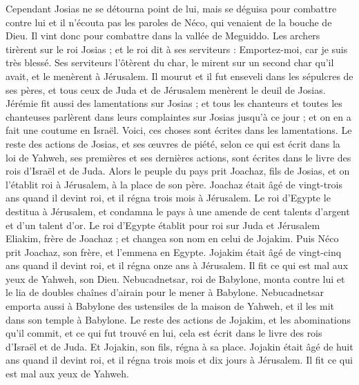 \begin{multicols}{2}
Cependant Josias ne se détourna point de lui, mais se déguisa pour combattre contre lui et il n'écouta pas les paroles de Néco, qui venaient de la bouche de Dieu. Il vint donc pour combattre dans la vallée de Meguiddo.
Les archers tirèrent sur le roi Josias ; et le roi dit à ses serviteurs : Emportez-moi, car je suis très blessé.
Ses serviteurs l'ôtèrent du char, le mirent sur un second char qu'il avait, et le menèrent à Jérusalem. Il mourut et il fut enseveli dans les sépulcres de ses pères, et tous ceux de Juda et de Jérusalem menèrent le deuil de Josias.
Jérémie fit aussi des lamentations sur Josias ; et tous les chanteurs et toutes les chanteuses parlèrent dans leurs complaintes sur Josias jusqu'à ce jour ; et on en a fait une coutume en Israël. Voici, ces choses sont écrites dans les lamentations.
Le reste des actions de Josias, et ses œuvres de piété, selon ce qui est écrit dans la loi de Yahweh,
ses premières et ses dernières actions, sont écrites dans le livre des rois d'Israël et de Juda.
\VerseOne{}Alors le peuple du pays prit Joachaz, fils de Josias, et on l'établit roi à Jérusalem, à la place de son père.
Joachaz était âgé de vingt-trois ans quand il devint roi, et il régna trois mois à Jérusalem.
Le roi d'Egypte le destitua à Jérusalem, et condamna le pays à une amende de cent talents d'argent et d'un talent d'or.
Le roi d'Egypte établit pour roi sur Juda et Jérusalem Eliakim, frère de Joachaz ; et changea son nom en celui de Jojakim. Puis Néco prit Joachaz, son frère, et l'emmena en Egypte.
Jojakim était âgé de vingt-cinq ans quand il devint roi, et il régna onze ans à Jérusalem. Il fit ce qui est mal aux yeux de Yahweh, son Dieu.
Nebucadnetsar, roi de Babylone, monta contre lui et le lia de doubles chaînes d'airain pour le mener à Babylone.
Nebucadnetsar emporta aussi à Babylone des ustensiles de la maison de Yahweh, et il les mit dans son temple à Babylone.
Le reste des actions de Jojakim, et les abominations qu'il commit, et ce qui fut trouvé en lui, cela est écrit dans le livre des rois d'Israël et de Juda. Et Jojakin, son fils, régna à sa place.
Jojakin était âgé de huit ans quand il devint roi, et il régna trois mois et dix jours à Jérusalem. Il fit ce qui est mal aux yeux de Yahweh.

\end{multicols}
